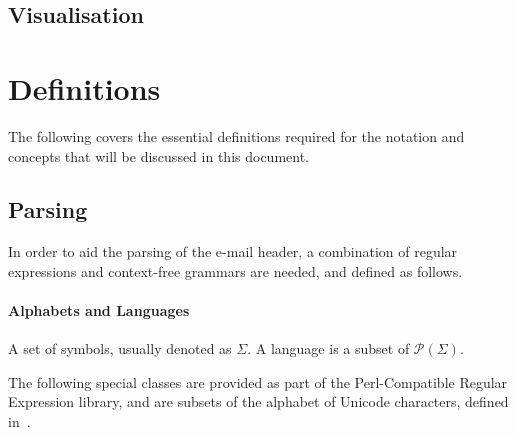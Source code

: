 \subsection{Visualisation}

\section{Definitions}

The following covers the essential definitions required for the notation and
concepts that will be discussed in this document.

\subsection{Parsing}

In order to aid the parsing of the e-mail header, a combination of regular
expressions and context-free grammars are needed, and defined as follows.

\paragraph{Alphabets and Languages}

A set of symbols, usually denoted as $\Sigma$.  A language is a subset of
$\mathcal P (\Sigma)$.

The following special classes are provided as part of the Perl-Compatible
Regular Expression library, and are subsets of the alphabet of Unicode
characters, defined in~\cite{php_group_gutmans_lerdorf_suraski_boerger}.

